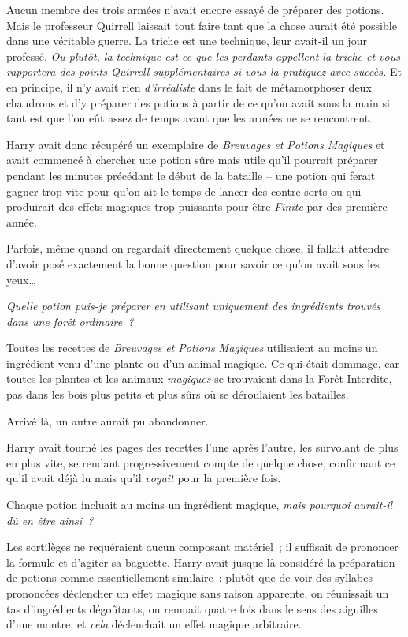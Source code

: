 Aucun membre des trois armées n'avait encore essayé de préparer des potions. Mais le professeur Quirrell laissait tout faire tant que la chose aurait été possible dans une véritable guerre. La triche est une technique, leur avait-il un jour professé. \emph{Ou plutôt, la technique est ce que les perdants appellent la triche et vous rapportera des points Quirrell supplémentaires si vous la pratiquez avec succès.} Et en principe, il n'y avait rien \emph{d'irréaliste} dans le fait de métamorphoser deux chaudrons et d'y préparer des potions à partir de ce qu'on avait sous la main si tant est que l'on eût assez de temps avant que les armées ne se rencontrent.

Harry avait donc récupéré un exemplaire de \emph{Breuvages et Potions Magiques} et avait commencé à chercher une potion sûre mais utile qu'il pourrait préparer pendant les minutes précédant le début de la bataille -- une potion qui ferait gagner trop vite pour qu'on ait le temps de lancer des contre-sorts ou qui produirait des effets magiques trop puissants pour être \emph{Finite} par des première année.

Parfois, même quand on regardait directement quelque chose, il fallait attendre d'avoir posé exactement la bonne question pour savoir ce qu'on avait sous les yeux…

\emph{Quelle potion puis-je préparer en utilisant uniquement des ingrédients trouvés dans une forêt ordinaire~?}

Toutes les recettes de \emph{Breuvages et Potions Magiques} utilisaient au moins un ingrédient venu d'une plante ou d'un animal magique. Ce qui était dommage, car toutes les plantes et les animaux \emph{magiques} se trouvaient dans la Forêt Interdite, pas dans les bois plus petits et plus sûrs où se déroulaient les batailles.

Arrivé là, un autre aurait pu abandonner.

Harry avait tourné les pages des recettes l'une après l'autre, les survolant de plus en plus vite, se rendant progressivement compte de quelque chose, confirmant ce qu'il avait déjà lu mais qu'il \emph{voyait} pour la première fois.

Chaque potion incluait au moins un ingrédient magique, \emph{mais pourquoi aurait-il dû en être ainsi~?}

Les sortilèges ne requéraient aucun composant matériel~; il suffisait de prononcer la formule et d'agiter sa baguette. Harry avait jusque-là considéré la préparation de potions comme essentiellement similaire~: plutôt que de voir des syllabes prononcées déclencher un effet magique sans raison apparente, on réunissait un tas d'ingrédients dégoûtants, on remuait quatre fois dans le sens des aiguilles d'une montre, et \emph{cela} déclenchait un effet magique arbitraire.


